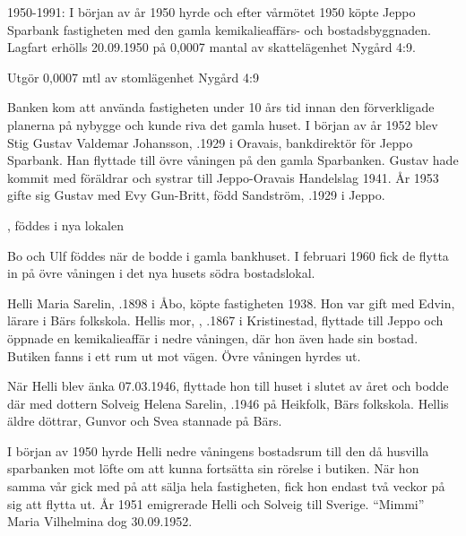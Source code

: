 1950-1991:
I början av år 1950 hyrde och efter vårmötet 1950 köpte Jeppo Sparbank fastigheten med den gamla kemikalieaffärs- och 	bostadsbyggnaden. Lagfart erhölls 20.09.1950 på 0,0007 mantal	av skattelägenhet Nygård 4:9.



%

Utgör 0,0007 mtl av stomlägenhet Nygård 4:9

%
Banken kom att använda fastigheten under 10 års tid innan den förverkligade planerna på nybygge och kunde riva det gamla huset. I början av år 1952 blev Stig Gustav Valdemar Johansson, .1929 i Oravais, bankdirektör för Jeppo Sparbank. Han flyttade till övre våningen på den gamla Sparbanken. Gustav hade kommit med föräldrar och systrar till Jeppo-Oravais Handelslag 1941. År 1953 gifte sig Gustav med Evy Gun-Britt, född Sandström, .1929 i Jeppo.
\begin{jhchildren}
  \item {}
  \item {}
  \item {}, föddes i nya lokalen
\end{jhchildren}
Bo och Ulf föddes när de bodde i gamla bankhuset. I februari 1960 fick de flytta in på övre våningen i det nya husets södra bostadslokal.


%
Helli Maria Sarelin, .1898 i Åbo, köpte fastigheten 1938. Hon var gift med Edvin, lärare i Bärs folkskola. Hellis mor, , .1867 i Kristinestad, flyttade till Jeppo och öppnade en kemikalieaffär i nedre våningen, där hon även hade sin bostad. Butiken fanns i ett rum ut mot vägen. Övre våningen hyrdes ut.

När Helli blev änka 07.03.1946, flyttade hon till huset i slutet av året och bodde där med dottern Solveig Helena Sarelin, .1946 på Heikfolk, Bärs folkskola. Hellis äldre döttrar, Gunvor och Svea stannade på Bärs.

I början av 1950 hyrde Helli nedre våningens bostadsrum till den då husvilla sparbanken mot löfte om att kunna fortsätta sin rörelse i butiken. När hon samma vår gick med på att sälja hela fastigheten, fick hon endast två veckor på sig att flytta ut. År 1951 emigrerade Helli och Solveig till Sverige. ``Mimmi'' Maria Vilhelmina dog 30.09.1952.

